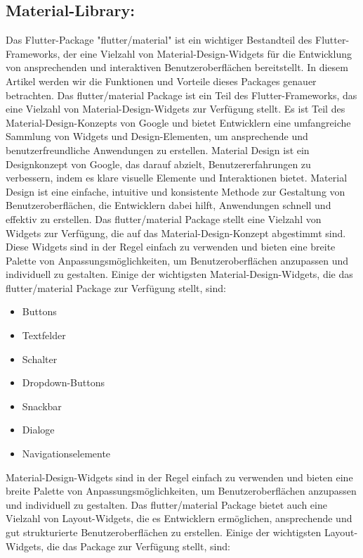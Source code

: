 \subsection*{Material-Library:}
Das Flutter-Package "flutter/material" ist ein wichtiger Bestandteil des Flutter-Frameworks, der eine Vielzahl von Material-Design-Widgets für die Entwicklung von ansprechenden und interaktiven Benutzeroberflächen bereitstellt. 
In diesem Artikel werden wir die Funktionen und Vorteile dieses Packages genauer betrachten.
Das flutter/material Package ist ein Teil des Flutter-Frameworks, das eine Vielzahl von Material-Design-Widgets zur Verfügung stellt. 
Es ist Teil des Material-Design-Konzepts von Google und bietet Entwicklern eine umfangreiche Sammlung von Widgets und Design-Elementen, um ansprechende und benutzerfreundliche Anwendungen zu erstellen.
Material Design ist ein Designkonzept von Google, das darauf abzielt, Benutzererfahrungen zu verbessern, indem es klare visuelle Elemente und Interaktionen bietet. 
Material Design ist eine einfache, intuitive und konsistente Methode zur Gestaltung von Benutzeroberflächen, die Entwicklern dabei hilft, Anwendungen schnell und effektiv zu erstellen.
Das flutter/material Package stellt eine Vielzahl von Widgets zur Verfügung, die auf das Material-Design-Konzept abgestimmt sind. 
Diese Widgets sind in der Regel einfach zu verwenden und bieten eine breite Palette von Anpassungsmöglichkeiten, um Benutzeroberflächen anzupassen und individuell zu gestalten.
Einige der wichtigsten Material-Design-Widgets, die das flutter/material Package zur Verfügung stellt, sind:
\begin{itemize}
    \item Buttons
    \item Textfelder
    \item Schalter
    \item Dropdown-Buttons
    \item Snackbar
    \item Dialoge
    \item Navigationselemente
\end{itemize}
Material-Design-Widgets sind in der Regel einfach zu verwenden und bieten eine breite Palette von Anpassungsmöglichkeiten, 
um Benutzeroberflächen anzupassen und individuell zu gestalten.
\newline
Das flutter/material Package bietet auch eine Vielzahl von Layout-Widgets, die es Entwicklern ermöglichen, ansprechende und gut strukturierte Benutzeroberflächen zu erstellen. 
Einige der wichtigsten Layout-Widgets, die das Package zur Verfügung stellt, sind:

